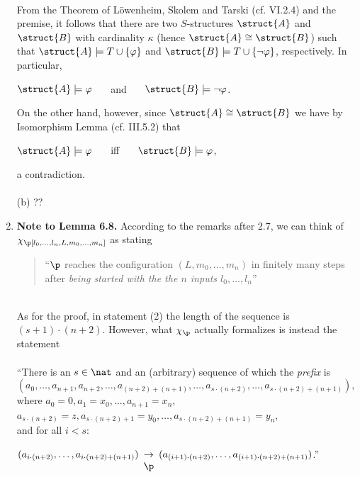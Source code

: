 \begin{enumerate}[1.]
\ \\
From the Theorem of L\"{o}wenheim, Skolem and Tarski (cf. VI.2.4) and the premise, it follows that there are two $S$-structures $\struct{A}$ and $\struct{B}$ with cardinality $\kappa$ (hence $\struct{A} \cong \struct{B}$) such that $\struct{A} \models T \cup \{ \varphi \}$ and $\struct{B} \models T \cup \{ \neg\varphi \}$, respectively. In particular,
\begin{center}
$\struct{A} \models \varphi$ \ \ \ and \ \ \ $\struct{B} \models \neg\varphi$.
\end{center}
On the other hand, however, since $\struct{A} \cong \struct{B}$ we have by Isomorphism Lemma (cf. III.5.2) that
\begin{center}
$\struct{A} \models \varphi$ \ \ \ iff \ \ \ $\struct{B} \models \varphi$,
\end{center}
a contradiction.\\
\ \\
(b) ??
%
\item \textbf{Note to Lemma 6.8.} According to the remarks after 2.7, we can think of $\chi_\p
 [l_0, \ldots, l_n, L, m_0, \ldots, m_n]$ as stating
\begin{quote}
``$\p$ reaches the configuration $(L, m_0, \ldots, m_n)$ in finitely many steps after \emph{being started with the the $n$ inputs $l_0, \ldots, l_n$}''
\end{quote}
\ \\
As for the proof, in statement (2) the length of the sequence is $(s + 1) \cdot (n + 2)$. However, what $\chi_\p$ actually formalizes is instead the statement\\
\ \\
``There is an $s \in \nat$ and an (arbitrary) sequence of which the \emph{prefix} is
$(a_0, \ldots, a_{n + 1}, a_{n + 2}, \ldots, a_{(n + 2) + (n + 1)}, \ldots, a_{s \cdot (n + 2)}, \ldots, a_{s \cdot (n + 2) + (n + 1)}),$ where $a_0 = 0, a_1 = x_0, \ldots, a_{n + 1} = x_n$,\\ $a_{s \cdot (n + 2)} = z, a_{s \cdot (n + 2) + 1} = y_0, \ldots, a_{s \cdot (n + 2) + (n + 1)} = y_n$,\\
and for all $i < s$:\\
$(a_{i \cdot (n + 2)}, \ldots, a_{i \cdot (n + 2) + (n + 1)}) \begin{array}{c} \ \cr \rightarrow \cr \p \end{array} (a_{(i + 1) \cdot (n + 2)}, \ldots, a_{(i + 1) \cdot (n + 2) + (n + 1)})$.''\\
\ \\

\end{enumerate}
